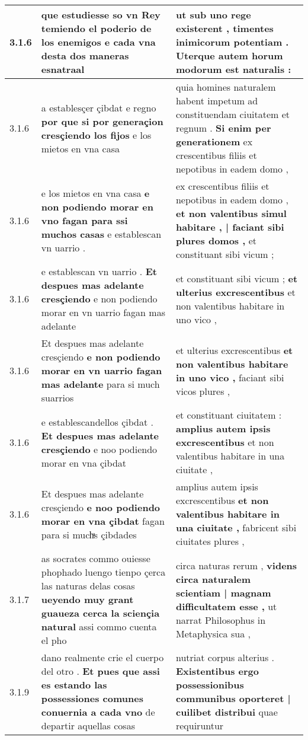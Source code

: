 \begin{tabular}{|p{1cm}|p{6.5cm}|p{6.5cm}|}
3.1.6 & que estudiesse so vn Rey \textbf{ temiendo el poderio de los enemigos } e cada vna desta dos maneras esnatraal & ut sub uno rege existerent , \textbf{ timentes inimicorum potentiam . } Uterque autem horum modorum est naturalis : \\\hline
3.1.6 & a establesçer çibdat e regno \textbf{ por que si por generaçion cresçiendo los fijos } e los mietos en vna casa & quia homines naturalem habent impetum ad constituendam ciuitatem et regnum . \textbf{ Si enim per generationem } ex crescentibus filiis et nepotibus in eadem domo , \\\hline
3.1.6 & e los mietos en vna casa \textbf{ e non podiendo morar en vno fagan para ssi muchos casas } e establescan vn uarrio . & ex crescentibus filiis et nepotibus in eadem domo , \textbf{ et non valentibus simul habitare , | faciant sibi plures domos , } et constituant sibi vicum ; \\\hline
3.1.6 & e establescan vn uarrio . \textbf{ Et despues mas adelante cresçiendo } e non podiendo morar en vn uarrio fagan mas adelante & et constituant sibi vicum ; \textbf{ et ulterius excrescentibus } et non valentibus habitare in uno vico , \\\hline
3.1.6 & Et despues mas adelante cresçiendo \textbf{ e non podiendo morar en vn uarrio fagan mas adelante } para si much suarrios & et ulterius excrescentibus \textbf{ et non valentibus habitare in uno vico , } faciant sibi vicos plures , \\\hline
3.1.6 & e establescandellos çibdat . \textbf{ Et despues mas adelante cresçiendo } e noo podiendo morar en vna çibdat & et constituant ciuitatem : \textbf{ amplius autem ipsis excrescentibus } et non valentibus habitare in una ciuitate , \\\hline
3.1.6 & Et despues mas adelante cresçiendo \textbf{ e noo podiendo morar en vna çibdat } fagan para si muchͣs çibdades & amplius autem ipsis excrescentibus \textbf{ et non valentibus habitare in una ciuitate , } fabricent sibi ciuitates plures , \\\hline
3.1.7 & as socrates commo ouiesse phophado luengo tienpo çerca las naturas delas cosas \textbf{ ueyendo muy grant guaueza cerca la sciençia natural } assi commo cuenta el pho & circa naturas rerum , \textbf{ videns circa naturalem scientiam | magnam difficultatem esse , } ut narrat Philosophus in Metaphysica sua , \\\hline
3.1.9 & dano realmente crie el cuerpo del otro . \textbf{ Et pues que assi es estando las possessiones comunes conuernia a cada vno } de departir aquellas cosas & nutriat corpus alterius . \textbf{ Existentibus ergo possessionibus communibus oporteret | cuilibet distribui } quae requiruntur \\\hline

\end{tabular}
